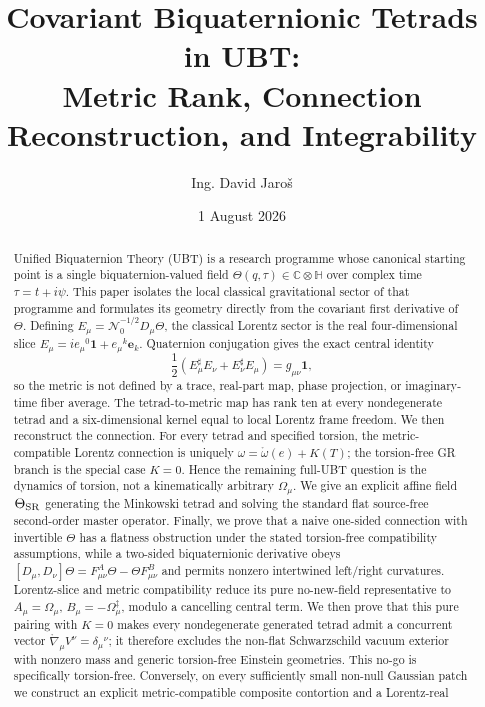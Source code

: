 \documentclass[12pt,a4paper]{article}
\title{\textbf{Covariant Biquaternionic Tetrads in UBT:\\
Metric Rank, Connection Reconstruction, and Integrability}}
\author{Ing. David Jaroš}
\date{1 August 2026}
\theoremstyle{remark}\newtheorem{remark}[definition]{Remark}
\begin{document}
\maketitle
\UBTProvenanceNotice

\begin{abstract}
Unified Biquaternion Theory (UBT) is a research programme whose canonical
starting point is a single biquaternion-valued field
$\Theta(q,\tau)\in\mathbb C\otimes\mathbb H$ over complex time
$\tau=t+i\psi$.  This paper isolates the local classical gravitational
sector of that programme and formulates its geometry directly from the
covariant first derivative of $\Theta$.  Defining
$E_\mu=\mathcal N_0^{-1/2}D_\mu\Theta$, the classical Lorentz sector is the
real four-dimensional slice
$E_\mu=i e_\mu{}^0\mathbf1+e_\mu{}^k\mathbf e_k$.
Quaternion conjugation gives the exact central identity
\[
 \frac12(E_\mu^\sharp E_\nu+E_\nu^\sharp E_\mu)
 =g_{\mu\nu}\mathbf1,
\]
so the metric is not defined by a trace, real-part map, phase projection, or
imaginary-time fiber average.  The tetrad-to-metric map has rank ten at every
nondegenerate tetrad and a six-dimensional kernel equal to local Lorentz frame
freedom.  We then reconstruct the connection.  For every tetrad and specified
torsion, the metric-compatible Lorentz connection is uniquely
$\omega=\mathring\omega(e)+K(T)$; the torsion-free GR branch is the special case
$K=0$.  Hence the remaining full-UBT question is the dynamics of torsion, not a
kinematically arbitrary $\Omega_\mu$.  We give an explicit affine field
$\Theta_{\rm SR}$ generating the Minkowski tetrad and solving the standard flat
source-free second-order master operator.  Finally, we prove that a naive
one-sided connection with invertible $\Theta$ has a flatness obstruction under
the stated torsion-free compatibility assumptions, while a two-sided
biquaternionic derivative obeys
$[D_\mu,D_\nu]\Theta=F^A_{\mu\nu}\Theta-\Theta F^B_{\mu\nu}$ and permits
nonzero intertwined left/right curvatures.  Lorentz-slice and metric
compatibility reduce its pure no-new-field representative to
$A_\mu=\Omega_\mu$, $B_\mu=-\Omega_\mu^\ddagger$, modulo a cancelling central
term.  We then prove that this pure pairing with $K=0$ makes every
nondegenerate generated tetrad admit a concurrent vector
$\mathring\nabla_\mu V^\nu=\delta_\mu{}^\nu$; it therefore excludes the
non-flat Schwarzschild vacuum exterior with nonzero mass and generic
torsion-free Einstein geometries.  This no-go is specifically torsion-free.
Conversely, on every sufficiently small non-null Gaussian patch we construct
an explicit metric-compatible composite contortion and a Lorentz-real

\end{abstract}
\end{document}
